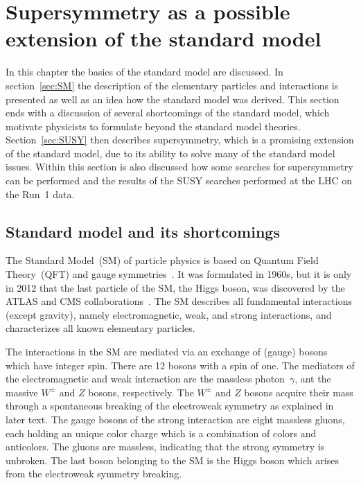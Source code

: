 \chapter{Supersymmetry as a possible extension of the standard model}

In this chapter the basics of the standard model are discussed. In section~\ref{sec:SM} the description of the elementary particles and interactions is presented as well as an idea how the standard model was derived. This section ends with a discussion of several shortcomings of the standard model, which motivate physicists to formulate beyond the standard model theories. Section~\ref{sec:SUSY} then describes supersymmetry, which is a promising extension of the standard model, due to its ability to solve many of the standard model issues. Within this section is also discussed how some searches for supersymmetry can be performed and the results of the SUSY searches performed at the LHC on the Run~1 data. 

\section{Standard model and its shortcomings~\label{sec:SM}}

The Standard Model~(SM) of particle physics is based on Quantum Field Theory~(QFT) and gauge symmetries~\cite{9783527406012}. It was formulated in 1960s, but it is only in 2012 that the last particle of the SM, the Higgs boson, was discovered by the ATLAS and CMS collaborations~\cite{Chatrchyan:2012xdj, Aad:2012tfa}. The SM describes all fundamental interactions (except gravity), namely electromagnetic, weak, and strong interactions, and characterizes all known elementary particles. 


The interactions in the SM are mediated via an exchange of (gauge) bosons which have integer spin. There are 12 bosons with a spin of one. The mediators of the electromagnetic and weak interaction are the massless photon~$\gamma$, ant the massive $W^{\pm}$ and $Z$ bosons, respectively. The $W^{\pm}$ and $Z$ bosons acquire their mass through a spontaneous breaking of the electroweak symmetry as explained in later text. The gauge bosons of the strong interaction are eight massless gluons, each holding an unique color charge which is a combination of colors and anticolors. The gluons are massless, indicating that the strong symmetry is unbroken. The last boson belonging to the SM is the Higgs boson which arises from the electroweak symmetry breaking. 

